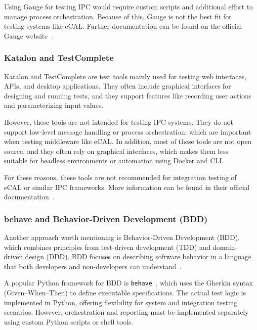 \vspace{1em}
Using Gauge for testing IPC would require custom scripts and additional effort to manage process orchestration. Because of this, Gauge is not the best fit for testing systems like eCAL. Further documentation can be found on the official Gauge website~\cite{GaugeDocs}.

\newpage
\subsubsection*{Katalon and TestComplete}

 Katalon and TestComplete are test tools mainly used for testing web interfaces, APIs, and desktop applications. They often include graphical interfaces for designing and running tests, and they support features like recording user actions and parameterizing input values.

\vspace{1em}
However, these tools are not intended for testing IPC systems. They do not support low-level message handling or process orchestration, which are important when testing middleware like eCAL. In addition, most of these tools are not open source, and they often rely on graphical interfaces, which makes them less suitable for headless environments or automation using Docker and CLI.

\vspace{1em}
For these reasons, these tools are not recommended for integration testing of eCAL or similar IPC frameworks. More information can be found in their official documentation~\cite{KatalonDocs,TestCompleteDocs}.

\subsubsection*{behave and Behavior-Driven Development (BDD)}

Another approach worth mentioning is Behavior-Driven Development (BDD), which combines principles from test-driven development (TDD) and domain-driven design (DDD). BDD focuses on describing software behavior in a language that both developers and non-developers can understand~\cite{North2006}.

\vspace{1em}
A popular Python framework for BDD is \texttt{behave}~\cite{BehaveDocs}, which uses the Gherkin syntax (Given–When–Then) to define executable specifications. The actual test logic is implemented in Python, offering flexibility for system and integration testing scenarios. However, orchestration and reporting must be implemented separately using custom Python scripts or shell tools.

